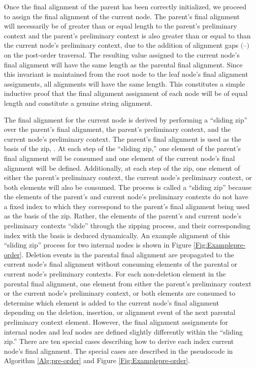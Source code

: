 \documentclass{bmcart}
\newcommand*\gap{\textrm{(--)}}
\begin{document}
Once the final alignment of the parent has been correctly initialized, we proceed to assign the final alignment of the current node.
The parent's final alignment will necessarily be of greater than or equal length to the parent's preliminary context and the parent's preliminary context is also greater than or equal to than the current node's preliminary context, due to the addition of alignment gaps $\gap$ on the post-order traversal.
The resulting value assigned to the current node's final alignment will have the same length as the parental final alignment.
Since this invariant is maintained from the root node to the leaf node's final alignment assignments, all alignments will have the same length.
This constitutes a simple inductive proof that the final alignment assignment of each node will be of equal length and constitute a genuine string alignment.

The final alignment for the current node is derived by performing a ``sliding zip'' over the parent's final alignment, the parent's preliminary context, and the current node's preliminary context.
The parent's final alignment is used as the basis of the zip, .
At each step of the ``sliding zip,'' one element of the parent's final alignment will be consumed and one element of the current node's final alignment will be defined.
Additionally, at each step of the zip, one element of either the parent's preliminary context, the current node's preliminary context, or both elements will also be consumed.
The process is called a ``sliding zip'' because the elements of the parent's and current node's preliminary contexts do not have a fixed index to which they correspond to the parent's final alignment being used as the basis of the zip.
Rather, the elements of the parent's and current node's preliminary contexts ``slide'' through the zipping process, and their corresponding index with the basis is deduced dynamically.
An example alignment of this ``sliding zip'' process for two internal  nodes is shown in Figure \ref{Fig:Examplepre-order}.
Deletion events in the parental final alignment are propagated to the current node's final alignment without consuming elements of the parental or current node's preliminary contexts.
For each non-deletion element in the parental final alignment, one element from either the parent's preliminary context or the current node's preliminary context, or both elements are consumed to determine which element is added to the current node's final alignment depending on the deletion, insertion, or alignment event of the next parental preliminary context element.
However, the final alignment assignments for internal nodes and leaf nodes are defined slightly differently within the ``sliding zip.''
There are ten special cases describing how to derive each index current node's final alignment. The special cases are described in the pseudocode in Algorithm \ref{Alg:pre-order} and Figure \ref{Fig:Examplepre-order}.
\end{document}
